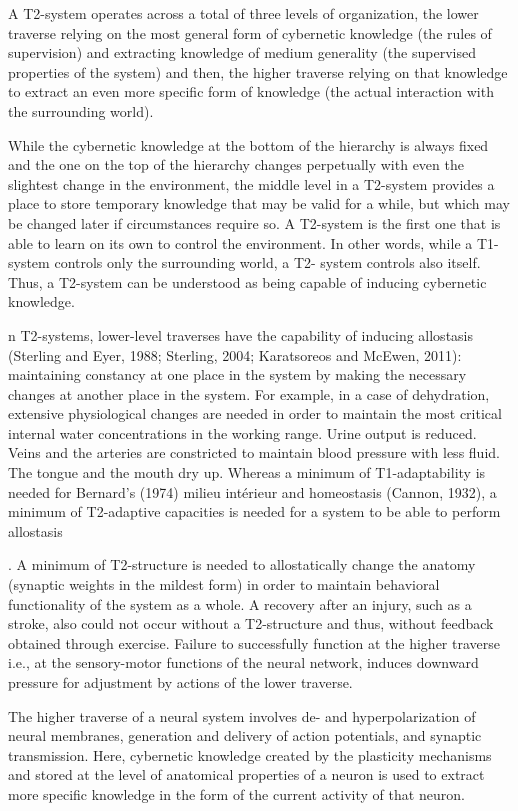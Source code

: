\documentclass[10pt,a4paper]{article}
\begin{document}
A T2-system operates across a total of three levels of organization,
the lower traverse relying on the most general form of
cybernetic knowledge (the rules of supervision) and extracting
knowledge of medium generality (the supervised properties of the
system) and then, the higher traverse relying on that knowledge to
extract an even more specific form of knowledge (the actual
interaction with the surrounding world).

While the
cybernetic knowledge at the bottom of the hierarchy is always
fixed and the one on the top of the hierarchy changes perpetually
with even the slightest change in the environment, the middle
level in a T2-system provides a place to store temporary knowledge
that may be valid for a while, but which may be changed later
if circumstances require so. A T2-system is the first one that is able
to learn on its own to control the environment. In other words,
while a T1-system controls only the surrounding world, a T2-
system controls also itself. Thus, a T2-system can be understood as
being capable of inducing cybernetic knowledge.


n T2-systems, lower-level traverses have the capability of inducing
allostasis (Sterling and Eyer, 1988; Sterling, 2004; Karatsoreos and
McEwen, 2011): maintaining constancy at one place in the system
by making the necessary changes at another place in the system.
For example, in a case of dehydration, extensive physiological
changes are needed in order to maintain the most critical internal
water concentrations in the working range. Urine output is
reduced. Veins and the arteries are constricted to maintain blood
pressure with less fluid. The tongue and the mouth dry up.
Whereas a minimum of T1-adaptability is needed for Bernard’s
(1974) milieu intérieur and homeostasis (Cannon, 1932), a minimum
of T2-adaptive capacities is needed for a system to be able to
perform allostasis 

. A minimum of T2-structure is needed
to allostatically change the anatomy (synaptic weights in the mildest
form) in order to maintain behavioral functionality of the system as a
whole. A recovery after an injury, such as a stroke, also could not
occur without a T2-structure and thus, without feedback obtained
through exercise. Failure to successfully function at the higher
traverse i.e., at the sensory-motor functions of the neural network,
induces downward pressure for adjustment by actions of the lower
traverse.

The higher traverse of a neural system involves de- and hyperpolarization
of neural membranes, generation and delivery of action
potentials, and synaptic transmission. Here, cybernetic knowledge
created by the plasticity mechanisms and stored at the level of
anatomical properties of a neuron is used to extract more specific
knowledge in the form of the current activity of that neuron.
\end{document}
